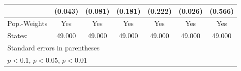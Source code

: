 {\begin{tabular}{l*{6}{c}}
            &     (0.043)         &     (0.081)         &     (0.181)         &     (0.222)         &     (0.026)         &     (0.566)         \\
\hline
Pop.-Weights&         Yes         &         Yes         &         Yes         &         Yes         &         Yes         &         Yes         \\
States:     &      49.000         &      49.000         &      49.000         &      49.000         &      49.000         &      49.000         \\
\hline\hline
\multicolumn{7}{l}{\footnotesize Standard errors in parentheses}\\
\multicolumn{7}{l}{\footnotesize \sym{*} \(p<0.1\), \sym{**} \(p<0.05\), \sym{***} \(p<0.01\)}\\
\end{tabular}
}

